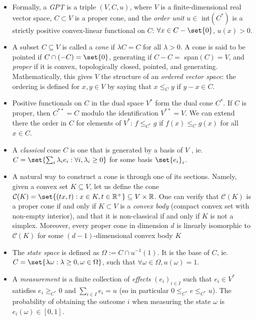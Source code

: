 \documentclass{article}
\theoremstyle{definition}
\theoremstyle{remark}
\begin{document}
\begin{itemize}
\item Formally, a \emph{GPT} is a triple $(V, C, u)$, where $V$ is a finite-dimensional real vector space, $C \subset V$ is a proper cone, and the \emph{order unit} $u \in $ int$(C^*)$ is a strictly positive convex-linear functional on $C$: $\forall x \in C-\set{0}$, $u(x) > 0$.

\item A subset $C \subseteq V$ is called a \emph{cone} if $\lambda C = C$ for all $\lambda > 0$. A cone is said to be pointed if $C \cap (-C) = \set{0}$, generating if $C - C = $ span$(C) = V$, and \emph{proper} if it is convex, topologically closed, pointed, and generating. Mathematically, this gives $V$ the structure of an \emph{ordered vector space}: the ordering is defined for $x, y \in V$ by saying that $x \leq_C y$ if $y - x \in C$.

\item Positive functionals on $C$ in the dual space $V^*$ form the dual cone $C^*$. If $C$ is proper, then $C^{**} = C$ modulo the identification $V^{**} = V$. We can extend there the order in $C$ for elements of $V^*$: $f \leq_{C^*} g$ if $f(x) \leq_C g(x)$ for all $x \in C$.

\item A \emph{classical} cone $C$ is one that is generated by a basis of $V$ , ie. $C = \set{\sum_i \lambda_i e_i : \forall i, \lambda_i \geq 0}$ for some basis $\set{e_i}_i$.

\item A natural way to construct a cone is through one of its sections. Namely, given a convex set $K \subseteq V$, let us define the cone $\mathcal{C}(K) = \set{(tx, t) : x \in K, t \in \mathbb{R}^+ } \subseteq V \times \mathbb{R}$. One can verify that $\mathcal{C}(K)$ is a proper cone if and only if $K \subset V$ is a \emph{convex body} (compact convex set with non-empty interior), and that it is non-classical if and only if $K$ is not a simplex. Moreover, every proper cone in dimension $d$ is linearly isomorphic to $\mathcal{C}(K)$ for some $(d-1)$-dimensional convex body $K$

\item The \emph{state space} is defined as $\Omega := C \cap u^{-1}(1)$. It is the base of $C$, ie. $C = \set{\lambda \omega : \lambda \geq 0, \omega \in \Omega}$, such that $\forall \omega \in \Omega, u(\omega) = 1$.

\item A \emph{measurement} is a finite collection of \emph{effects} $(e_i)_{i \in I}$ such that $e_i \in V^*$ satisfies $e_i \geq_{C^*} 0$ and $\sum_{i \in I} e_i = u$ (so in particular $0 \leq_{C^*} e \leq_{C^*} u$). The probability of obtaining the outcome $i$ when measuring the state $\omega$ is $e_i(\omega) \in [0,1]$.
\end{itemize}
\end{document}
